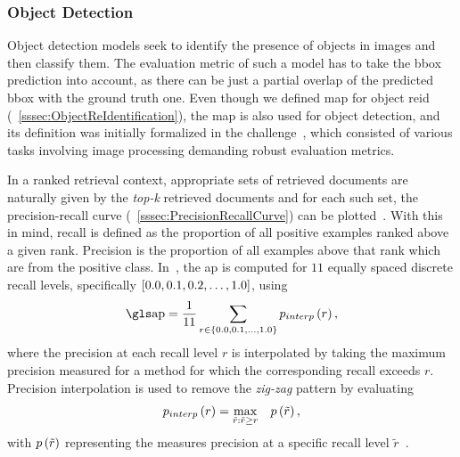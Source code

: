 \subsubsection{Object Detection}

Object detection models seek to identify the presence of objects in images and then classify them. The evaluation metric of such a model has to take the \gls{bbox} prediction into account, as there can be just a partial overlap of the predicted \gls{bbox} with the ground truth one. Even though we defined \gls{map} for object \gls{reid} (\sectionstr{}~\ref{sssec:ObjectReIdentification}), the \gls{map} is also used for object detection, and its definition was initially formalized in the \pascalvoc{} challenge~\cite{everingham2010pascalvoc}, which consisted of various tasks involving image processing demanding robust evaluation metrics.

In a ranked retrieval context, appropriate sets of retrieved documents are naturally given by the \emph{top-k} retrieved documents and for each such set, the precision-recall curve (\sectionstr{}~\ref{sssec:PrecisionRecallCurve}) can be plotted~\cite{salton1983introduction}. With this in mind, recall is defined as the proportion of all positive examples ranked above a given rank. Precision is the proportion of all examples above that rank which are from the positive class. In~\cite{everingham2010pascalvoc}, the \gls{ap} is computed for $11$ equally spaced discrete recall levels, specifically $\left[ {0.0, 0.1, 0.2, \dots, 1.0} \right]$, using
\begin{equation}
    \AP = \frac{1}{11} \sum_{r \in \cbrackets{0.0, 0.1, \dots, 1.0}} \func{p_{interp}}{r},
\end{equation}
where the precision at each recall level $r$ is interpolated by taking the maximum precision measured for a method for which the corresponding recall exceeds $r$. Precision interpolation is used to remove the \emph{zig-zag} pattern by evaluating
\begin{equation}
    {p_{interp}} \left( r \right) = \underset{\tilde{r}:\tilde{r} \geq r}{\max} \quad {p} \left( \tilde{r} \right),
\end{equation}
with ${p} \left( \tilde{r} \right)$ representing the measures precision at a specific recall level $\tilde{r}$~\cite{everingham2010pascalvoc, salton1983introduction}.
